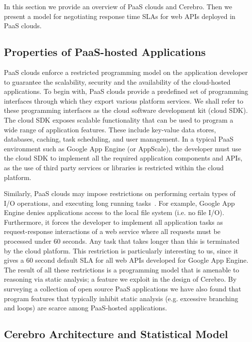 In this section we provide an overview of PaaS clouds and Cerebro. Then we present a model for 
negotiating response time SLAs for web APIs deployed in PaaS clouds.

\subsection{Properties of PaaS-hosted Applications}
PaaS clouds enforce a restricted programming model on the application developer to guarantee
the scalability, security and the availability of the cloud-hosted applications. To begin with,
PaaS clouds provide a predefined set of programming interfaces through which they export 
various platform services. We shall refer to these programming interfaces as the cloud software
development kit (cloud SDK). The cloud SDK exposes scalable functionality that can be used to 
program a wide range of application features. These include key-value data stores, databases, 
caching, task scheduling, and user management. In a typical PaaS environment
such as Google App Engine (or AppScale), the developer must use the cloud SDK to implement
all the required application components and APIs, as the use of third party services or libraries is
restricted within the cloud platform. 

Similarly, PaaS clouds may impose restrictions on performing
certain types of I/O operations, and executing long running tasks~\cite{gae-limits,azure-limits,gae-sandbox}. 
For example, Google App Engine
denies applications access to the local file system (i.e. no file I/O). Furthermore, it forces the
developer to implement all application tasks as request-response interactions of a web service
where all requests must be processed
under 60 seconds. Any task that takes longer than this is terminated by the cloud platform.
This restriction is particularly interesting to us, since it gives a 60 second default SLA
for all web APIs developed for Google App Engine.
The result of all these restrictions is a programming model that is
amenable to reasoning via static analysis; a feature we exploit in the design of Cerebro. By surveying
a collection of open source PaaS applications we have also found that program features that typically
inhibit static analysis (e.g. excessive branching and loops) are scarce among PaaS-hosted
applications.

\subsection{Cerebro Architecture and Statistical Model}


